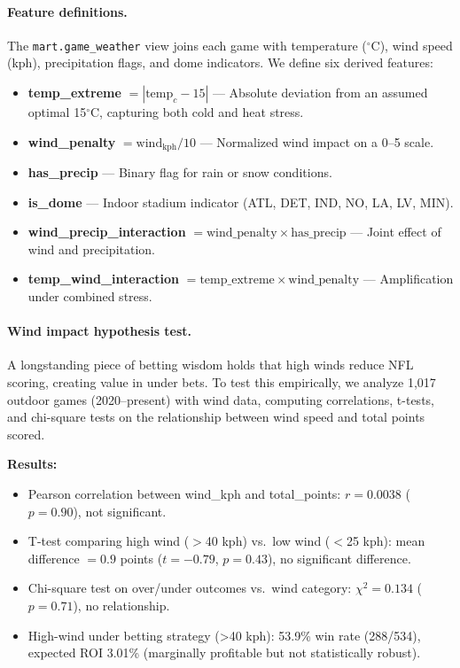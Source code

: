 \paragraph{Feature definitions.}
The \texttt{mart.game\_weather} view joins each game with temperature ($^\circ$C), wind speed (kph), precipitation flags, and dome indicators. We define six derived features:
\begin{itemize}
  \item \textbf{temp\_extreme} $= |\text{temp}_c - 15|$ — Absolute deviation from an assumed optimal 15$^\circ$C, capturing both cold and heat stress.
  \item \textbf{wind\_penalty} $= \text{wind}_\text{kph} / 10$ — Normalized wind impact on a 0--5 scale.
  \item \textbf{has\_precip} — Binary flag for rain or snow conditions.
  \item \textbf{is\_dome} — Indoor stadium indicator (ATL, DET, IND, NO, LA, LV, MIN).
  \item \textbf{wind\_precip\_interaction} $= \text{wind\_penalty} \times \text{has\_precip}$ — Joint effect of wind and precipitation.
  \item \textbf{temp\_wind\_interaction} $= \text{temp\_extreme} \times \text{wind\_penalty}$ — Amplification under combined stress.
\end{itemize}

\paragraph{Wind impact hypothesis test.}
A longstanding piece of betting wisdom holds that high winds reduce NFL scoring, creating value in under bets. To test this empirically, we analyze 1,017 outdoor games (2020--present) with wind data, computing correlations, t-tests, and chi-square tests on the relationship between wind speed and total points scored.

\textbf{Results:}
\begin{itemize}
  \item Pearson correlation between wind\_kph and total\_points: $r = 0.0038$ ($p = 0.90$), not significant.
  \item T-test comparing high wind ($>$40 kph) vs.\ low wind ($<$25 kph): mean difference $= 0.9$ points ($t = -0.79$, $p = 0.43$), no significant difference.
  \item Chi-square test on over/under outcomes vs.\ wind category: $\chi^2 = 0.134$ ($p = 0.71$), no relationship.
  \item High-wind under betting strategy (>40 kph): 53.9\% win rate (288/534), expected ROI 3.01\% (marginally profitable but not statistically robust).
\end{itemize}


